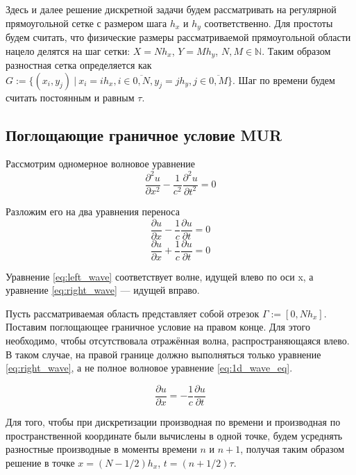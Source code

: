 Здесь и далее решение дискретной задачи будем рассматривать на регулярной прямоугольной сетке с размером шага $h_x$ и $h_y$ соответственно. Для простоты будем считать, что физические размеры рассматриваемой прямоугольной области нацело делятся на шаг сетки: $X=N h_x$, $Y = M h_y$, $N,M \in \mathbb{N}$. Таким образом разностная сетка определяется как $G := \{(x_i, y_j) ~|~ x_i = ih_x, i \in \overline{0,N}, y_j = jh_y, j \in \overline{0,M} \}$. Шаг по времени будем считать постоянным и равным $\tau$.

\subsection{Поглощающие граничное условие MUR}

Рассмотрим одномерное волновое уравнение
\begin{equation}
    \dfrac{\partial^2 u}{\partial x^2} - \dfrac{1}{c^2}\dfrac{\partial^2 u}{\partial t^2} = 0
    \label{eq:1d_wave_eq}
\end{equation}

Разложим его на два уравнения переноса
\begin{equation}
    \dfrac{\partial u}{\partial x} - \dfrac{1}{c} \dfrac{\partial u}{\partial t} = 0
    \label{eq:left_wave}
\end{equation}
\begin{equation}
    \dfrac{\partial u}{\partial x} + \dfrac{1}{c} \dfrac{\partial u}{\partial t} = 0
    \label{eq:right_wave}
\end{equation}

Уравнение \ref{eq:left_wave} соответствует волне, идущей влево по оси x, а уравнение \ref{eq:right_wave} --- идущей вправо.

Пусть рассматриваемая область представляет собой отрезок $\Gamma := [0, N h_x]$. Поставим поглощающее граничное условие на правом конце. Для этого необходимо, чтобы отсутствовала отражённая волна, распространяющаяся влево. В таком случае, на правой границе должно выполняться только уравнение \ref{eq:right_wave}, а не полное волновое уравнение \ref{eq:1d_wave_eq}.

\begin{equation}
    \dfrac{\partial u}{\partial x} = -\dfrac{1}{c} \dfrac{\partial u}{\partial t}
\end{equation}

Для того, чтобы при дискретизации производная по времени и производная по пространственной координате были вычислены в одной точке, будем усреднять разностные производные в моменты времени $n$ и $n+1$, получая таким образом решение в точке $x = (N-1/2)h_x$, $t=(n+1/2)\tau$.

